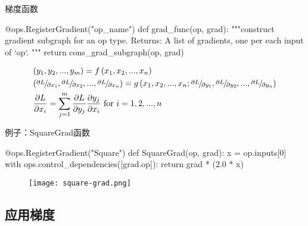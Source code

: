 \begin{frame}[fragile]{梯度函数}
  \begin{python}
@ops.RegisterGradient("op_name")
def grad_func(op, grad):
  """construct gradient subgraph for an op type.
  Returns:
    A list of gradients, one per each input of `op`.
  """
  return cons_grad_subgraph(op, grad) 
  \end{python}

\[\begin{gathered}
  \left( {{y_1},{y_2},...,{y_m}} \right) = f\left( {{x_1},{x_2},...,{x_n}} \right) \hfill \\
  \left( {{\raise0.5ex\hbox{$\scriptstyle {\partial L}$}
\kern-0.1em/\kern-0.15em
\lower0.25ex\hbox{$\scriptstyle {\partial {x_1}}$}},{\raise0.5ex\hbox{$\scriptstyle {\partial L}$}
\kern-0.1em/\kern-0.15em
\lower0.25ex\hbox{$\scriptstyle {\partial {x_2}}$}},...,{\raise0.5ex\hbox{$\scriptstyle {\partial L}$}
\kern-0.1em/\kern-0.15em
\lower0.25ex\hbox{$\scriptstyle {\partial {x_n}}$}}} \right) = g\left( {{x_1},{x_2},...,{x_n};{\raise0.5ex\hbox{$\scriptstyle {\partial L}$}
\kern-0.1em/\kern-0.15em
\lower0.25ex\hbox{$\scriptstyle {\partial {y_1}}$}},{\raise0.5ex\hbox{$\scriptstyle {\partial L}$}
\kern-0.1em/\kern-0.15em
\lower0.25ex\hbox{$\scriptstyle {\partial {y_2}}$}},...,{\raise0.5ex\hbox{$\scriptstyle {\partial L}$}
\kern-0.1em/\kern-0.15em
\lower0.25ex\hbox{$\scriptstyle {\partial {y_n}}$}}} \right) \hfill \\
  \frac{{\partial L}}{{\partial {x_i}}} = \sum\limits_{j = 1}^m {\frac{{\partial L}}{{\partial {y_j}}}\frac{{\partial {y_j}}}{{\partial {x_i}}}} {\text{     for }}i = 1,2,...,n{\text{ }} \hfill \\ 
\end{gathered} \]
\end{frame}

\begin{frame}[fragile]{例子：SquareGrad函数}
  \begin{python}
@ops.RegisterGradient("Square")
def SquareGrad(op, grad):
  x = op.inputs[0]
  with ops.control_dependencies([grad.op]):
    return grad * (2.0 * x)
  \end{python}

  \begin{figure}
    \centering
    \texttt{[image: square-grad.png]}
  \end{figure}
\end{frame}

\subsection{应用梯度}

